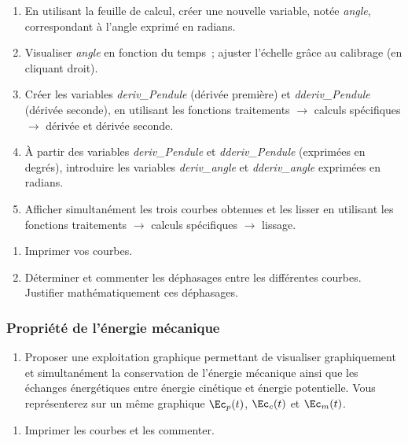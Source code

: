 \documentclass[a4paper, 11pt, final, garamond]{book}
\begin{document}
\begin{enumerate}
    \item En utilisant la feuille de calcul, créer une nouvelle variable, notée
        \textit{angle}, correspondant à l'angle exprimé en radians.
    \item Visualiser \textit{angle} en fonction du temps~; ajuster l'échelle
        grâce au calibrage (en cliquant droit).
    \item Créer les variables \textit{deriv\_Pendule} (dérivée première) et
        \textit{dderiv\_Pendule} (dérivée seconde), en utilisant les fonctions
        traitements $\rightarrow$ calculs spécifiques $\rightarrow$ dérivée et
        dérivée seconde.
    \item À partir des variables \textit{deriv\_Pendule} et
        \textit{dderiv\_Pendule} (exprimées en degrés), introduire les variables
        \textit{deriv\_angle} et \textit{dderiv\_angle} exprimées en radians. 
    \item Afficher simultanément les trois courbes obtenues et les lisser en
        utilisant les fonctions traitements $\rightarrow$ calculs spécifiques
        $\rightarrow$ lissage.
\end{enumerate}
\begin{enumerate}[label=\sqenumi, start=4]
    \item Imprimer vos courbes.
    \item Déterminer et commenter les déphasages entre les différentes courbes.
        Justifier mathématiquement ces déphasages.
\end{enumerate}

\subsubsection{Propriété de l'énergie mécanique}

\begin{enumerate}[resume, label=\clenumi]
    \item Proposer une exploitation graphique permettant de visualiser
        graphiquement et simultanément la conservation de l'énergie mécanique
        ainsi que les échanges énergétiques entre énergie cinétique et énergie
        potentielle. Vous représenterez sur un même graphique $\Ec_p(t)$,
        $\Ec_c(t)$ et $\Ec_m(t)$.
\end{enumerate}
\begin{enumerate}[resume, label=\sqenumi]
    \item Imprimer les courbes et les commenter.
\end{enumerate}
\end{document}
